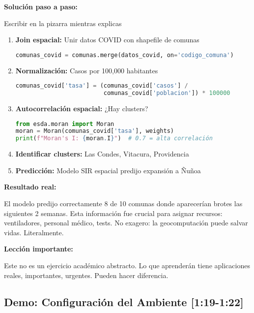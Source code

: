 \documentclass[11pt,a4paper]{article}
\newcommand{\tiempo}[1]{\textcolor{timecolor}{\faIcon{clock} \textbf{[#1]}}}
\newcommand{\decir}[1]{\begin{tcolorbox}[colback=blue!5,colframe=usachblue,title={\faIcon{microphone} DECIR}]#1\end{tcolorbox}}
\newcommand{\hacer}[1]{\begin{tcolorbox}[colback=green!5,colframe=green!50!black,title={\faIcon{hand-point-right} HACER}]#1\end{tcolorbox}}
\begin{document}
\textbf{Solución paso a paso:}

\hacer{Escribir en la pizarra mientras explicas}

\decir{
\begin{enumerate}
    \item \textbf{Join espacial:} Unir datos COVID con shapefile de comunas
    \begin{lstlisting}[language=Python]
comunas_covid = comunas.merge(datos_covid, on='codigo_comuna')
    \end{lstlisting}
    
    \item \textbf{Normalización:} Casos por 100,000 habitantes
    \begin{lstlisting}[language=Python]
comunas_covid['tasa'] = (comunas_covid['casos'] / 
                         comunas_covid['poblacion']) * 100000
    \end{lstlisting}
    
    \item \textbf{Autocorrelación espacial:} ¿Hay clusters?
    \begin{lstlisting}[language=Python]
from esda.moran import Moran
moran = Moran(comunas_covid['tasa'], weights)
print(f"Moran's I: {moran.I}")  # 0.7 = alta correlación
    \end{lstlisting}
    
    \item \textbf{Identificar clusters:} Las Condes, Vitacura, Providencia
    
    \item \textbf{Predicción:} Modelo SIR espacial predijo expansión a Ñuñoa
\end{enumerate}
}

\textbf{Resultado real:}

\decir{El modelo predijo correctamente 8 de 10 comunas donde aparecerían brotes las siguientes 2 semanas. Esta información fue crucial para asignar recursos: ventiladores, personal médico, tests. No exagero: la geocomputación puede salvar vidas. Literalmente.}

\textbf{Lección importante:}

\decir{Este no es un ejercicio académico abstracto. Lo que aprenderán tiene aplicaciones reales, importantes, urgentes. Pueden hacer diferencia.}

\subsection{Demo: Configuración del Ambiente \tiempo{1:19-1:22}}
\end{document}

